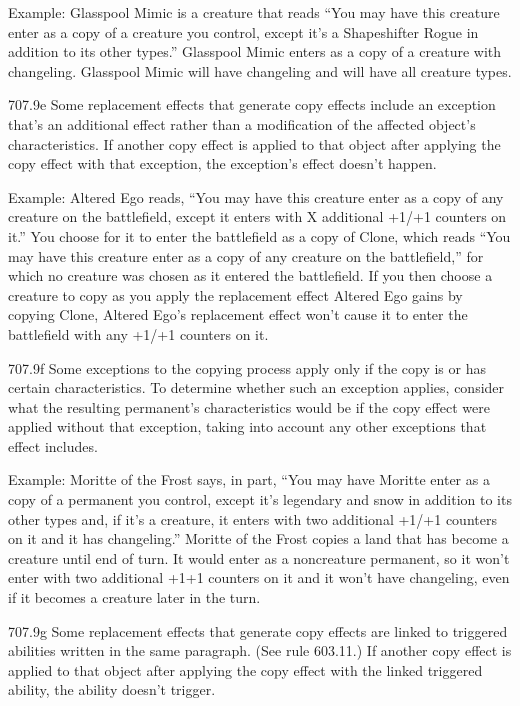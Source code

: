 Example: Glasspool Mimic is a creature that reads “You may have this creature enter as a copy of a creature you control, except it’s a Shapeshifter Rogue in addition to its other types.” Glasspool Mimic enters as a copy of a creature with changeling. Glasspool Mimic will have changeling and will have all creature types.

707.9e Some replacement effects that generate copy effects include an exception that’s an additional effect rather than a modification of the affected object’s characteristics. If another copy effect is applied to that object after applying the copy effect with that exception, the exception’s effect doesn’t happen.

Example: Altered Ego reads, “You may have this creature enter as a copy of any creature on the battlefield, except it enters with X additional +1/+1 counters on it.” You choose for it to enter the battlefield as a copy of Clone, which reads “You may have this creature enter as a copy of any creature on the battlefield,” for which no creature was chosen as it entered the battlefield. If you then choose a creature to copy as you apply the replacement effect Altered Ego gains by copying Clone, Altered Ego’s replacement effect won’t cause it to enter the battlefield with any +1/+1 counters on it.

707.9f Some exceptions to the copying process apply only if the copy is or has certain characteristics. To determine whether such an exception applies, consider what the resulting permanent’s characteristics would be if the copy effect were applied without that exception, taking into account any other exceptions that effect includes.

Example: Moritte of the Frost says, in part, “You may have Moritte enter as a copy of a permanent you control, except it’s legendary and snow in addition to its other types and, if it’s a creature, it enters with two additional +1/+1 counters on it and it has changeling.” Moritte of the Frost copies a land that has become a creature until end of turn. It would enter as a noncreature permanent, so it won’t enter with two additional +1+1 counters on it and it won’t have changeling, even if it becomes a creature later in the turn.

707.9g Some replacement effects that generate copy effects are linked to triggered abilities written in the same paragraph. (See rule 603.11.) If another copy effect is applied to that object after applying the copy effect with the linked triggered ability, the ability doesn’t trigger.

